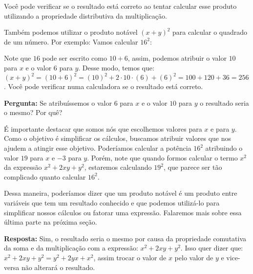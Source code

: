 \documentclass[a4paper, 12pt]{article}
\begin{document}
\noindent Você pode verificar se o resultado está correto ao tentar calcular esse produto utilizando a propriedade distributiva da multiplicação. 


\noindent Também podemos utilizar o produto notável \((x+y)^2\) para calcular o quadrado de um número. Por exemplo: Vamos calcular   \(16^2\): 

\noindent Note que \(16\) pode ser escrito como \(10 + 6\), assim, podemos atribuir o valor \(10\) para \(x\) e o valor \(6\) para \(y\). Desse modo, temos que: \((x+y)^2 = (10+6)^2 = (10)^2 + 2\cdot{10}\cdot{(6)} + (6)^2 = 100 + 120 + 36 = 256\). Você pode verificar numa calculadora se o resultado está correto.  


\noindent \textbf{Pergunta:} Se atribuíssemos o valor \(6\) para \(x\) e o valor \(10\) para \(y\) o resultado seria o mesmo? Por quê? 


\noindent %
É importante destacar que somos nós que escolhemos valores para   \(x\) e para \(y\). Como o objetivo é simplificar os cálculos, buscamos atribuir valores que nos ajudem a atingir esse objetivo. Poderíamos calcular a potência   \(16^2\) atribuindo o valor \(19\) para \(x\) e \(-3\) para \(y\). Porém, note que quando formos calcular o termo \(x^2\) da expressão \(x^2 + 2xy + y^2\), estaremos calculando \(19^2\), que parece ser tão complicado quanto calcular \(16^2\).  

\noindent Dessa maneira, poderíamos dizer que um produto notável é um produto entre variáveis que tem um resultado conhecido e que podemos utilizá-lo para simplificar nossos cálculos ou fatorar uma expressão. Falaremos mais sobre essa última parte na próxima seção.   

\noindent \textbf{Resposta:} Sim, o resultado seria o mesmo por causa da propriedade comutativa da soma e da multiplicação com a expressão: \(x^2 + 2xy + y^2\). Isso quer dizer que: \(x^2 + 2xy + y^2 = y^2 + 2yx + x^2\), assim trocar o valor de \(x\) pelo valor de \(y\) e vice-versa não alterará o resultado. 
\end{document}
